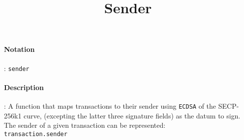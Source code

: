 \documentclass[10pt,a4paper,oneside]{scrartcl}
\author{}
\title{Sender}
\date{}
\begin{document}
\maketitle
\paragraph{Notation}: \texttt{sender}
\paragraph{Description}: A function that maps transactions to their sender using \texttt{ECDSA} of the SECP-256k1 curve, (excepting the latter three signature fields) as the datum to sign. The sender of a given transaction can be represented: 
\\
\texttt{transaction.sender}
\end{document}
